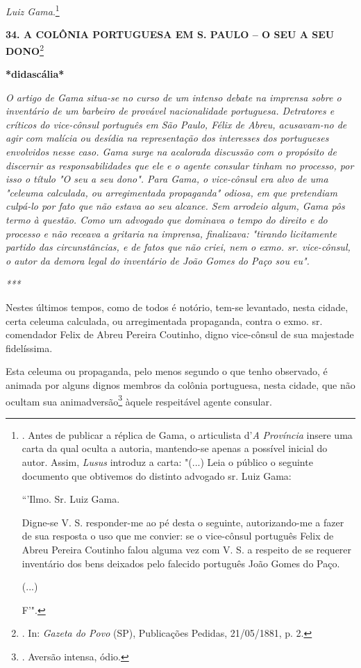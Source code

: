 \emph{Luiz Gama}.\footnote{. Antes de publicar a réplica de Gama, o
  articulista d'\emph{A} \emph{Província} insere uma carta da qual
  oculta a autoria, mantendo-se apenas a possível inicial do autor.
  Assim, \emph{Lusus} introduz a carta: "(...) Leia o público o seguinte
  documento que obtivemos do distinto advogado sr. Luiz Gama:

  ``'Ilmo. Sr. Luiz Gama.

  Digne-se V. S. responder-me ao pé desta o seguinte, autorizando-me a
  fazer de sua resposta o uso que me convier: se o vice-cônsul português
  Felix de Abreu Pereira Coutinho falou alguma vez com V. S. a respeito
  de se requerer inventário dos bens deixados pelo falecido português
  João Gomes do Paço.

  (...)

  F'".}

\textbf{34. A COLÔNIA PORTUGUESA EM S. PAULO -- O SEU A SEU
DONO}\footnote{. In: \emph{Gazeta do Povo} (SP), Publicações Pedidas,
  21/05/1881, p. 2.}

\textbf{*didascália*}

\emph{O artigo de Gama situa-se no curso de um intenso debate na
imprensa sobre o inventário de um barbeiro de provável nacionalidade
portuguesa. Detratores e críticos do vice-cônsul português em São Paulo,
Félix de Abreu, acusavam-no de agir com malícia ou desídia na
representação dos interesses dos portugueses envolvidos nesse caso. Gama
surge na acalorada discussão com o propósito de discernir as
responsabilidades que ele e o agente consular tinham no processo, por
isso o título "O seu a seu dono". Para Gama, o vice-cônsul era alvo de
uma "celeuma calculada, ou arregimentada propaganda" odiosa, em que
pretendiam culpá-lo por fato que não estava ao seu alcance. Sem arrodeio
algum, Gama pôs termo à questão. Como um advogado que dominava o tempo
do direito e do processo e não receava a gritaria na imprensa,
finalizava: "tirando licitamente partido das circunstâncias, e de fatos
que não criei, nem o exmo. sr. vice-cônsul, o autor da demora legal do
inventário de João Gomes do Paço sou eu". }

\emph{***}

Nestes últimos tempos, como de todos é notório, tem-se levantado, nesta
cidade, certa celeuma calculada, ou arregimentada propaganda, contra o
exmo. sr. comendador Felix de Abreu Pereira Coutinho, digno vice-cônsul
de sua majestade fidelíssima.

Esta celeuma ou propaganda, pelo menos segundo o que tenho observado, é
animada por alguns dignos membros da colônia portuguesa, nesta cidade,
que não ocultam sua animadversão\footnote{. Aversão intensa, ódio.}
àquele respeitável agente consular.


